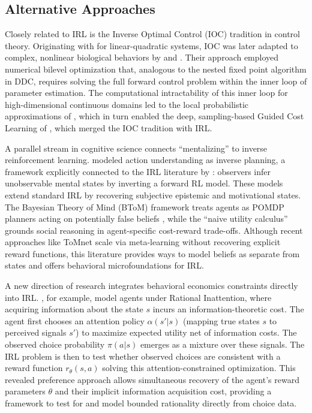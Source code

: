 \subsection{Alternative Approaches}

Closely related to IRL is the Inverse Optimal Control (IOC) tradition in control theory. Originating with \citet{kalman:1964} for linear-quadratic systems, IOC was later adapted to complex, nonlinear biological behaviors by \citet{locomotion:2010} and \citet{berret:2011}. Their approach employed numerical bilevel optimization that, analogous to the nested fixed point algorithm in DDC, requires solving the full forward control problem within the inner loop of parameter estimation. The computational intractability of this inner loop for high-dimensional continuous domains led to the local probabilistic approximations of \citet{levine:2012}, which in turn enabled the deep, sampling-based Guided Cost Learning of \citet{guidedcostlearning:2016}, which merged the IOC tradition with IRL.

A parallel stream in cognitive science connects ``mentalizing'' to inverse reinforcement learning. \citet{baker:2009} modeled action understanding as inverse planning, a framework explicitly connected to the IRL literature by \citet{jaraettinger:2019}: observers infer unobservable mental states by inverting a forward RL model. These models extend standard IRL by recovering subjective epistemic and motivational states. The Bayesian Theory of Mind (BToM) framework treats agents as POMDP planners acting on potentially false beliefs \citep{baker:2017}, while the ``naive utility calculus'' \citep{jaraettinger:2016} grounds social reasoning in agent-specific cost-reward trade-offs. Although recent approaches like ToMnet \citep{rabinowitz:2018} scale via meta-learning without recovering explicit reward functions, this literature provides ways to model beliefs as separate from states and offers behavioral microfoundations for IRL.

A new direction of research integrates behavioral economics constraints directly into IRL. \citet{hoiles:2020}, for example, model agents under Rational Inattention, where acquiring information about the state $s$ incurs an information-theoretic cost. The agent first chooses an attention policy $\alpha(s'|s)$ (mapping true states $s$ to perceived signals $s'$) to maximize expected utility net of information costs. The observed choice probability $\pi(a|s)$ emerges as a mixture over these signals. The IRL problem is then to test whether observed choices are consistent with a reward function $r_\theta(s,a)$ solving this attention-constrained optimization. This revealed preference approach allows simultaneous recovery of the agent's reward parameters $\theta$ and their implicit information acquisition cost, providing a framework to test for and model bounded rationality directly from choice data.

